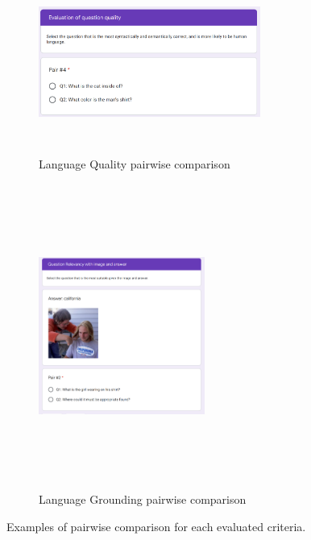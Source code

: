 \documentclass{article}
\begin{document}
\begin{figure}[h!]
\begin{subfigure}{\textwidth}
\centering
\includegraphics[clip,width=0.8\textwidth,height=6cm]{./quality_ex1.png}
\caption{Language Quality pairwise comparison}
\end{subfigure}
\begin{subfigure}{\textwidth}
\centering
\includegraphics[clip,width=0.6\textwidth,height=10cm]{./grounding_question_ex1.png}
\caption{Language Grounding pairwise comparison}
\end{subfigure}
\caption{Examples of pairwise comparison for each evaluated criteria.}
\label{app:fig:human:eval:examples}
\end{figure}
\end{document}
